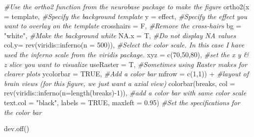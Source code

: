 \documentclass{article}
\newenvironment{Shaded}{\begin{snugshade}}{\end{snugshade}}
\newcommand{\AttributeTok}[1]{\textcolor[rgb]{0.77,0.63,0.00}{#1}}
\newcommand{\CommentTok}[1]{\textcolor[rgb]{0.56,0.35,0.01}{\textit{#1}}}
\newcommand{\ConstantTok}[1]{\textcolor[rgb]{0.00,0.00,0.00}{#1}}
\newcommand{\DecValTok}[1]{\textcolor[rgb]{0.00,0.00,0.81}{#1}}
\newcommand{\FloatTok}[1]{\textcolor[rgb]{0.00,0.00,0.81}{#1}}
\newcommand{\FunctionTok}[1]{\textcolor[rgb]{0.00,0.00,0.00}{#1}}
\newcommand{\NormalTok}[1]{#1}
\newcommand{\SpecialCharTok}[1]{\textcolor[rgb]{0.00,0.00,0.00}{#1}}
\newcommand{\StringTok}[1]{\textcolor[rgb]{0.31,0.60,0.02}{#1}}
\begin{document}
\begin{Shaded}
\begin{Highlighting}[]
\CommentTok{\#Use the ortho2 function from the neurobase package to make the figure}
\FunctionTok{ortho2}\NormalTok{(}\AttributeTok{x =}\NormalTok{ template,   }\CommentTok{\#Specify the background template}
       \AttributeTok{y =}\NormalTok{ effect,     }\CommentTok{\#Specify the effect you want to overlay on the template}
       \AttributeTok{crosshairs =}\NormalTok{ F, }\CommentTok{\#Remove the cross{-}hairs}
       \AttributeTok{bg =} \StringTok{"white"}\NormalTok{,   }\CommentTok{\#Make the background white }
       \AttributeTok{NA.x =}\NormalTok{ T,       }\CommentTok{\#Do not display NA values}
       \AttributeTok{col.y=} \FunctionTok{rev}\NormalTok{(viridis}\SpecialCharTok{::}\FunctionTok{inferno}\NormalTok{(}\AttributeTok{n =} \DecValTok{500}\NormalTok{)), }\CommentTok{\#Select the color scale. In this case I have used the inferno scale from the viridis package. }
       \AttributeTok{xyz =} \FunctionTok{c}\NormalTok{(}\DecValTok{70}\NormalTok{,}\DecValTok{50}\NormalTok{,}\DecValTok{80}\NormalTok{), }\CommentTok{\#set the x y \& z slice you want to visualize}
       \AttributeTok{useRaster =}\NormalTok{ T,     }\CommentTok{\#Sometimes using Raster makes for clearer plots}
       \AttributeTok{ycolorbar =} \ConstantTok{TRUE}\NormalTok{,  }\CommentTok{\#Add a color bar}
       \AttributeTok{mfrow =} \FunctionTok{c}\NormalTok{(}\DecValTok{1}\NormalTok{,}\DecValTok{1}\NormalTok{)) }\SpecialCharTok{+}  \CommentTok{\#layout of brain views (for this figure, we just want a axial view)}
  \FunctionTok{colorbar}\NormalTok{(breaks, }\AttributeTok{col =} \FunctionTok{rev}\NormalTok{(viridis}\SpecialCharTok{::}\FunctionTok{inferno}\NormalTok{(}\AttributeTok{n=}\FunctionTok{length}\NormalTok{(breaks)}\SpecialCharTok{{-}}\DecValTok{1}\NormalTok{)), }\CommentTok{\#add a color bar with same color scale }
           \AttributeTok{text.col =} \StringTok{"black"}\NormalTok{, }\AttributeTok{labels =} \ConstantTok{TRUE}\NormalTok{, }\AttributeTok{maxleft =} \FloatTok{0.95}\NormalTok{)  }\CommentTok{\#Set the specifications for the color bar}

\FunctionTok{dev.off}\NormalTok{()}
\end{Highlighting}
\end{Shaded}
\end{document}
